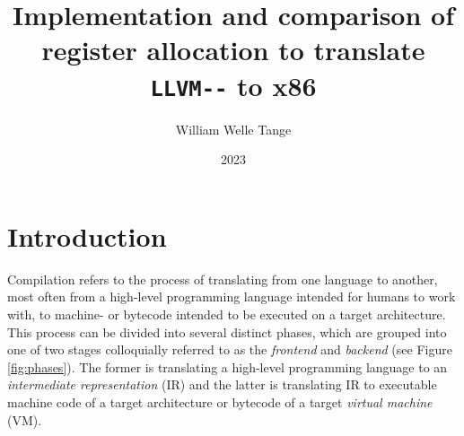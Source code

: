 \documentclass{article}
\title{Implementation and comparison of register allocation to translate \lstinline!LLVM--! to x86}
\author{William Welle Tange}
\date{2023}
\begin{document}
\maketitle

\tableofcontents
\newpage



    

\section{Introduction}

Compilation refers to the process of translating from one language to another, most often from a high-level programming language intended for humans to work with, to machine- or bytecode intended to be executed on a target architecture. This process can be divided into several distinct phases, which are grouped into one of two stages colloquially referred to as the \textit{frontend} and \textit{backend} (see Figure \ref{fig:phases}). The former is translating a high-level programming language to an \textit{intermediate representation} (IR) and the latter is translating IR to executable machine code of a target architecture or bytecode of a target \textit{virtual machine} (VM).
\end{document}

